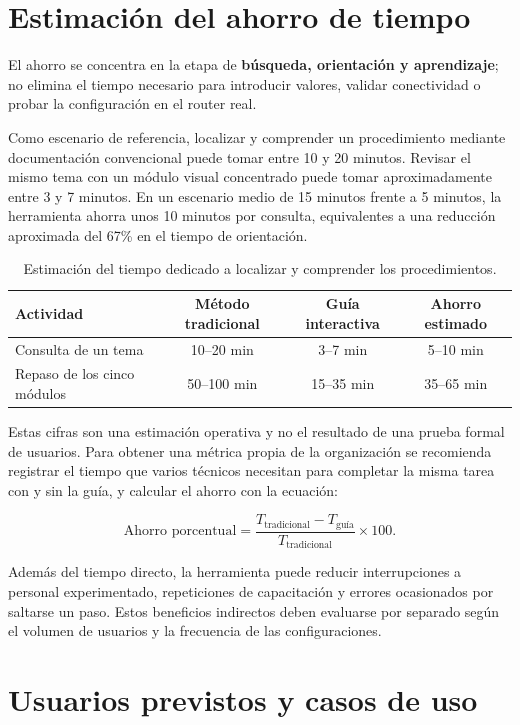 \documentclass[12pt,letterpaper]{article}
\begin{document}
\section{Estimación del ahorro de tiempo}

El ahorro se concentra en la etapa de \textbf{búsqueda, orientación y aprendizaje};
no elimina el tiempo necesario para introducir valores, validar conectividad o
probar la configuración en el router real.

Como escenario de referencia, localizar y comprender un procedimiento mediante
documentación convencional puede tomar entre 10 y 20 minutos. Revisar el mismo tema
con un módulo visual concentrado puede tomar aproximadamente entre 3 y 7 minutos.
En un escenario medio de 15 minutos frente a 5 minutos, la herramienta ahorra unos
10 minutos por consulta, equivalentes a una reducción aproximada del 67\% en el
tiempo de orientación.

\begin{table}[htbp]
\centering
\small
\begin{tabularx}{\textwidth}{@{}Xccc@{}}
\toprule
\textbf{Actividad} & \textbf{Método tradicional} & \textbf{Guía interactiva} & \textbf{Ahorro estimado} \\
\midrule
Consulta de un tema & 10--20 min & 3--7 min & 5--10 min \\
Repaso de los cinco módulos & 50--100 min & 15--35 min & 35--65 min \\
\bottomrule
\end{tabularx}
\caption{Estimación del tiempo dedicado a localizar y comprender los procedimientos.}
\label{tab:ahorro}
\end{table}

Estas cifras son una estimación operativa y no el resultado de una prueba formal de
usuarios. Para obtener una métrica propia de la organización se recomienda registrar
el tiempo que varios técnicos necesitan para completar la misma tarea con y sin la
guía, y calcular el ahorro con la ecuación:

\[
\text{Ahorro porcentual} =
\frac{T_{\text{tradicional}} - T_{\text{guía}}}
     {T_{\text{tradicional}}} \times 100.
\]

Además del tiempo directo, la herramienta puede reducir interrupciones a personal
experimentado, repeticiones de capacitación y errores ocasionados por saltarse un
paso. Estos beneficios indirectos deben evaluarse por separado según el volumen de
usuarios y la frecuencia de las configuraciones.

\section{Usuarios previstos y casos de uso}
\end{document}
